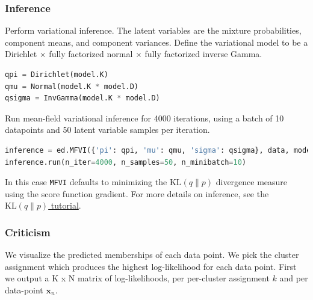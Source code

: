 \subsubsection{Inference}
Perform variational inference.
%
The latent variables are the mixture probabilities,
component means, and component variances.
Define the variational model to be a Dirichlet $\times$ fully factorized normal
$\times$ fully factorized inverse Gamma.
%
\begin{lstlisting}[language=Python]
qpi = Dirichlet(model.K)
qmu = Normal(model.K * model.D)
qsigma = InvGamma(model.K * model.D)
\end{lstlisting}

Run mean-field variational inference for 4000 iterations, using a batch
of 10 datapoints and 50 latent variable samples per iteration.
\begin{lstlisting}[language=Python]
inference = ed.MFVI({'pi': qpi, 'mu': qmu, 'sigma': qsigma}, data, model)
inference.run(n_iter=4000, n_samples=50, n_minibatch=10)
\end{lstlisting}
In this case
\texttt{MFVI} defaults to minimizing the
$\text{KL}(q\|p)$ divergence measure using the score function
gradient.
For more details on inference, see the \href{tut_KLqp.html}{$\text{KL}(q\|p)$ tutorial}.


\subsubsection{Criticism}

We visualize the predicted memberships of each data point.
We pick the cluster assignment which produces
the highest log-likelihood for each data point.
First we output a K x N matrix of log-likelihoods, per
per-cluster assignment $k$ and per data-point $\mathbf{x}_n$.

